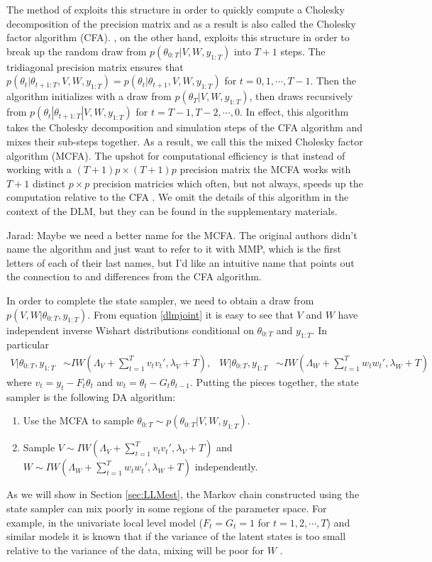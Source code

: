 \documentclass{article}
\newcommand{\jarad}[1]{{\color{red} Jarad: #1}}
\begin{document}
The method of  exploits this structure in order to quickly compute a Cholesky decomposition of the precision matrix and as a result is also called the Cholesky factor algorithm (CFA). , on the other hand, exploits this structure in order to break up the random draw from $p(\theta_{0:T}|V,W,y_{1:T})$ into $T+1$ steps. The tridiagonal precision matrix ensures that $p(\theta_{t}|\theta_{t+1:T},V,W,y_{1:T}) = p(\theta_{t}|\theta_{t+1},V,W,y_{1:T})$ for $t=0,1,\cdots,T-1$. Then the algorithm initializes with a draw from $p(\theta_T|V,W,y_{1:T})$, then draws recursively from $p(\theta_{t}|\theta_{t+1:T}|V,W,y_{1:T})$ for $t=T-1,T-2,\cdots,0$. In effect, this algorithm takes the Cholesky decomposition and simulation steps of the CFA algorithm and mixes their sub-steps together.  As a result, we call this the mixed Cholesky factor algorithm (MCFA). The upshot for computational efficiency is that instead of working with a $(T+1)p\times (T+1)p$ precision matrix the MCFA works with $T+1$ distinct $p\times p$ precision matricies which often, but not always, speeds up the computation relative to the CFA \cite{mccausland2011simulation}. We omit the details of this algorithm in the context of the DLM, but they can be found in the supplementary materials.

\jarad{Maybe we need a better name for the MCFA. The original authors didn't name the algorithm and just want to refer to it with MMP, which is the first letters of each of their last names, but I'd like an intuitive name that points out the connection to and differences from the CFA algorithm.}

In order to complete the state sampler, we need to obtain a draw from $p(V,W|\theta_{0:T},y_{1:T})$. From equation \ref{dlmjoint} it is easy to see that $V$ and $W$ have independent inverse Wishart distributions conditional on $\theta_{0:T}$ and $y_{1:T}$. In particular
\begin{align*}
  V|\theta_{0:T},y_{1:T} &\sim IW\left(\Lambda_V + \sum_{t=1}^Tv_tv_t',\lambda_V + T\right), &
  W|\theta_{0:T},y_{1:T} &\sim IW\left(\Lambda_W + \sum_{t=1}^Tw_tw_t',\lambda_{W} + T\right) %
\end{align*}
where $v_t = y_t - F_t\theta_t$ and $w_t = \theta_t - G_t\theta_{t-1}$. Putting the pieces together, the state sampler is the following DA algorithm:
\begin{enumerate}
\item Use the MCFA to sample $\theta_{0:T} \sim p(\theta_{0:T}|V,W,y_{1:T})$.
\item Sample $V \sim IW\left(\Lambda_V + \sum_{t=1}^Tv_tv_t',\lambda_V + T\right)$ and $W \sim IW\left(\Lambda_W + \sum_{t=1}^Tw_tw_t',\lambda_{W} + T\right)$ independently.
\end{enumerate}
As we will show in Section \ref{sec:LLMest}, the Markov chain constructed using the state sampler can mix poorly in some regions of the parameter space. For example, in the univariate local level model ($F_t=G_t=1$ for $t=1,2,\cdots,T$) and similar models it is known that if the variance of the latent states is too small relative to the variance of the data, mixing will be poor for $W$ \cite{fruhwirth2004efficient}.
\end{document}
